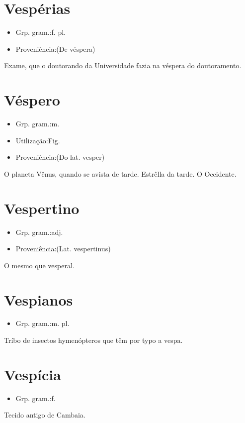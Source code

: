 \documentclass{article}
\begin{document}
\section{Vespérias}
\begin{itemize}
\item {Grp. gram.:f. pl.}
\end{itemize}
\begin{itemize}
\item {Proveniência:(De \textunderscore véspera\textunderscore )}
\end{itemize}
Exame, que o doutorando da Universidade fazia na véspera do doutoramento.
\section{Véspero}
\begin{itemize}
\item {Grp. gram.:m.}
\end{itemize}
\begin{itemize}
\item {Utilização:Fig.}
\end{itemize}
\begin{itemize}
\item {Proveniência:(Do lat. \textunderscore vesper\textunderscore )}
\end{itemize}
O planeta Vênus, quando se avista de tarde.
Estrêlla da tarde.
O Occidente.
\section{Vespertino}
\begin{itemize}
\item {Grp. gram.:adj.}
\end{itemize}
\begin{itemize}
\item {Proveniência:(Lat. \textunderscore vespertinus\textunderscore )}
\end{itemize}
O mesmo que \textunderscore vesperal\textunderscore .
\section{Vespianos}
\begin{itemize}
\item {Grp. gram.:m. pl.}
\end{itemize}
Tríbo de insectos hymenópteros que têm por typo a vespa.
\section{Vespícia}
\begin{itemize}
\item {Grp. gram.:f.}
\end{itemize}
Tecido antigo de Cambaia.
\end{document}
